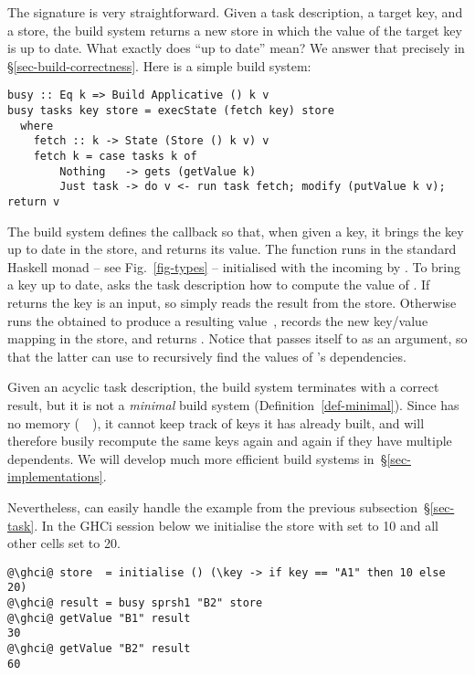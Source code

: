 \noindent
The signature is very straightforward. Given a task description, a target key,
and a store, the build system returns a new store in which the value of the
target key is up to date. What exactly does ``up to date'' mean?  We answer
that precisely in \S\ref{sec-build-correctness}. Here is a simple build system:

\vspace{1mm}
\begin{verbatim}
busy :: Eq k => Build Applicative () k v
busy tasks key store = execState (fetch key) store
  where
    fetch :: k -> State (Store () k v) v
    fetch k = case tasks k of
        Nothing   -> gets (getValue k)
        Just task -> do v <- run task fetch; modify (putValue k v); return v
\end{verbatim}
\vspace{1mm}

\noindent
The  build system defines the callback  so that, when given a
key, it brings the key up to date in the store, and returns its value.
The function  runs in the standard Haskell  monad -- see
Fig.~\ref{fig-types} -- initialised with the incoming  by .
To bring a key up to date,  asks the task description  how
to compute the value of . If  returns  the key is an
input, so  simply reads the result from the store. Otherwise 
runs the obtained  to produce a resulting value~, records the new
key/value mapping in the store, and returns . Notice that 
passes itself to  as an argument, so that the latter can use 
to recursively find the values of 's dependencies.

Given an acyclic task description, the  build system terminates with a
correct result, but it is not a \emph{minimal} build system
(Definition~\ref{def-minimal}). Since  has no memory
(~\hs{=}~\hs{()}), it cannot keep track of keys it has already built, and
will therefore busily recompute the same keys again and again if they have
multiple dependents. We will develop much more efficient build systems
in~\S\ref{sec-implementations}.

Nevertheless,  can easily handle the example 
from the previous subsection~\S\ref{sec-task}. In the GHCi session below we
initialise the store with  set to 10 and all other cells set to 20.

\begin{verbatim}
@\ghci@ store  = initialise () (\key -> if key == "A1" then 10 else 20)
@\ghci@ result = busy sprsh1 "B2" store
@\ghci@ getValue "B1" result
30
@\ghci@ getValue "B2" result
60
\end{verbatim}

